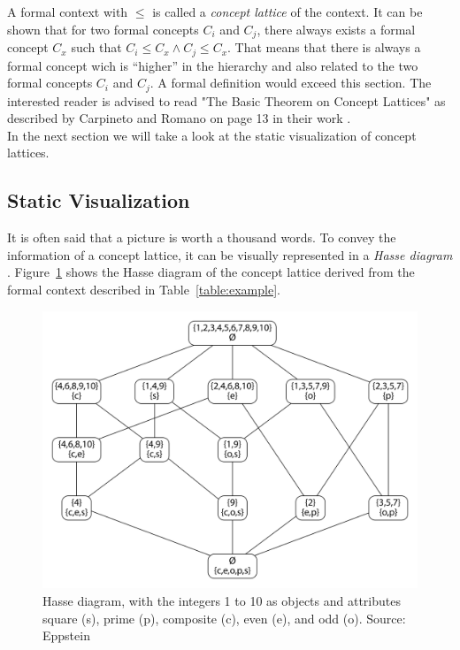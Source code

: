 \documentclass[11pt]{report}
\begin{document}
A formal context with $\le$ is called a \textit{concept lattice} of the context. It can be shown that for two formal concepts $C_i$ and $C_j$, there always exists a formal concept $C_x$ such that $C_i \le C_x \wedge C_j \le C_x$. That means that there is always a formal concept wich is ``higher'' in the hierarchy and also related to the two formal concepts $C_i$ and $C_j$. A formal definition would exceed this section. The interested reader is advised to read "The Basic Theorem on Concept Lattices" as described by Carpineto and Romano on page 13 in their work \cite{carpineto2004concept}.\\

In the next section we will take a look at the static visualization of concept lattices.

\subsection{Static Visualization}

It is often said that a picture is worth a thousand words. To convey the information of a concept lattice, it can be visually represented in a \textit{Hasse diagram} \cite{Ganter2012}. Figure~\ref{figure:example} shows the Hasse diagram of the concept lattice derived from the formal context described in Table~\ref{table:example}. \\

\begin{figure}[!ht]
	\centering
	\includegraphics[width=\linewidth]{./images/fcaExample}
\caption{Hasse diagram, with the integers 1 to 10 as objects and attributes square (s), prime (p), composite (c), even (e), and odd (o). Source: Eppstein \cite{fcaexample}}
\label{figure:example}
\end{figure}
\end{document}
